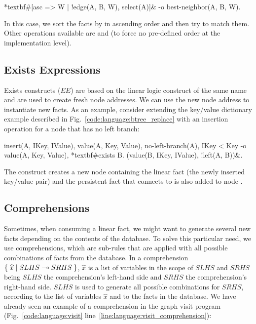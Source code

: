 \begin{Code}[commandchars=\*\#\&]
*textbf#[asc => W | !edge(A, B, W), select(A)]& -o best-neighbor(A, B, W).
\end{Code}

In this case, we sort the  facts by  in ascending order
and then try to match them. Other operations available are  and
 (to force no pre-defined order at the implementation level).

\subsection{Exists Expressions}\label{section:language:expressions}

Exists constructs ($EE$) are based on the linear logic construct of the same
name and are used to create fresh node addresses. We can use the new node address to
instantiate new facts. As an example, consider extending the
key/value dictionary example described in Fig.~\ref{code:language:btree_replace}
with an insertion operation for a node that has no left branch:

\begin{Code}[commandchars=\*\#\&]
insert(A, IKey, IValue),
value(A, Key, Value),
no-left-branch(A),
IKey < Key
   -o value(A, Key, Value),
      *textbf#exists B. (value(B, IKey, IValue), !left(A, B))&.
\end{Code}

The  construct creates a new node  containing the linear fact
 (the newly inserted key/value pair) and the
persistent fact  that connects  to  is also
added to node .

\subsection{Comprehensions}

Sometimes, when consuming a linear fact, we might want to generate several new
facts depending on the contents of the database. To solve this particular need,
we use comprehensions, which are sub-rules that are applied with all possible
combinations of facts from the database. In a comprehension
$\{ \; \widehat{x} \; | \; SLHS \multimap SRHS \; \}$, $\widehat{x}$ is a list of variables
in the scope of $SLHS$ and $SRHS$ being $SLHS$ the comprehension's left-hand
side and $SRHS$ the comprehension's right-hand side. $SLHS$ is used to generate
all possible combinations for $SRHS$, according to the list of variables
$\hat{x}$ and to the facts in the database. We have already seen an example of a
comprehension in the graph visit program (Fig.~\ref{code:language:visit}
line~\ref{line:language:visit_comprehension}):

